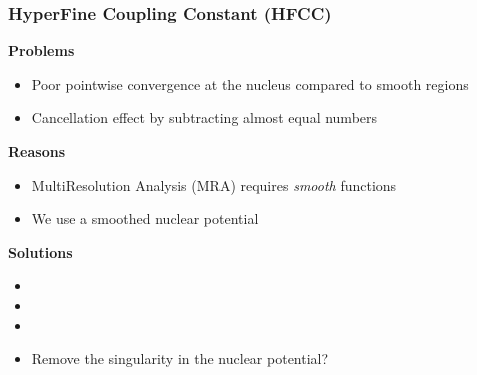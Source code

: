 \begin{frame}
\frametitle{HyperFine Coupling Constant (HFCC)}
\scriptsize

\textbf{Problems}
\begin{itemize}
\item Poor pointwise convergence at the nucleus compared to smooth regions
\item Cancellation effect by subtracting almost equal numbers
\end{itemize}

\vspace{5mm}

\textbf{Reasons}
\begin{itemize}
\item MultiResolution Analysis (MRA) requires \emph{smooth} functions
\item We use a smoothed nuclear potential
\end{itemize}

\vspace{5mm}

\textbf{Solutions}

\begin{itemize}
\item {}
\item {}
\item {}
\item Remove the singularity in the nuclear potential?
\end{itemize}
\end{frame}

